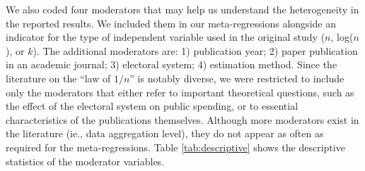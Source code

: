\documentclass[a4paper,12pt]{article}
\begin{document}
We also coded four moderators that may help us understand the heterogeneity in
the reported results. We included them in our meta-regressions alongside an
indicator for the type of independent variable used in the original study ($n$,
log($n$), or $k$). The additional moderators are: 1) publication year; 2) paper
publication in an academic journal; 3) electoral system; 4) estimation method.
Since the literature on the ``law of $1/n$'' is notably diverse, we were
restricted to include only the moderators that either refer to important
theoretical questions, such as the effect of the electoral system on public
spending, or to essential characteristics of the publications themselves.
Although more moderators exist in the literature (ie., data aggregation level),
they do not appear as often as required for the meta-regressions. Table
\ref{tab:descriptive} shows the descriptive statistics of the moderator
variables. 

\vspace{.5cm}
\end{document}
